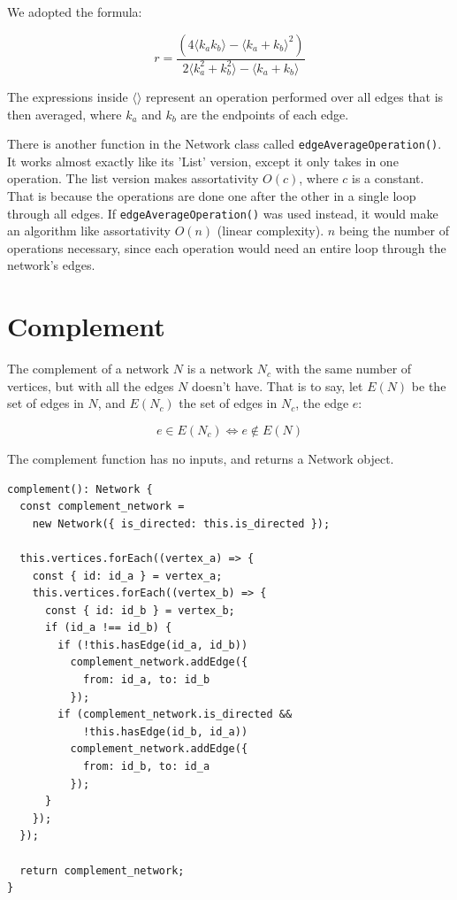 We adopted the formula:

$$r=\frac{(4\langle k_a k_b\rangle-\langle k_a+k_b\rangle^2)}{2\langle k_a^2+k_b^2\rangle-\langle k_a+k_b\rangle}$$

The expressions inside $\langle$$\rangle$ represent
an operation performed over all edges
that is then averaged,
where $k_a$ and $k_b$ are the endpoints of each edge.

There is another function in the Network class called \texttt{edgeAverageOperation()}.
It works almost exactly like its 'List' version, except it only takes in one operation.
The list version makes assortativity $O(c)$, where $c$ is a constant.
That is because the operations are done one after the other in a single loop through all edges.
If \texttt{edgeAverageOperation()} was used instead, it would make an algorithm like assortativity $O(n)$ (linear complexity).
$n$ being the number of operations necessary, since each operation would need an entire loop through the network's edges.

\section{Complement}

The complement of a network $N$ is a network $N_c$ with the same number of vertices,
but with all the edges $N$ doesn't have.
That is to say, let $E(N)$ be the set of edges in $N$,
and $E(N_c)$ the set of edges in $N_c$, the edge $e$:

$$e\in E(N_c)\iff e \notin E(N)$$

The complement function has no inputs, and returns a Network object.
\begin{verbatim}
complement(): Network {
  const complement_network =
    new Network({ is_directed: this.is_directed });

  this.vertices.forEach((vertex_a) => {
    const { id: id_a } = vertex_a;
    this.vertices.forEach((vertex_b) => {
      const { id: id_b } = vertex_b;
      if (id_a !== id_b) {
        if (!this.hasEdge(id_a, id_b))
          complement_network.addEdge({
            from: id_a, to: id_b
          });
        if (complement_network.is_directed &&
            !this.hasEdge(id_b, id_a))
          complement_network.addEdge({
            from: id_b, to: id_a
          });
      }
    });
  });

  return complement_network;
}
\end{verbatim}

